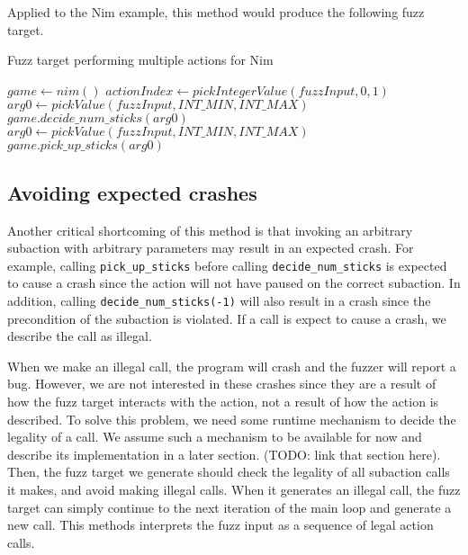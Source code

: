 Applied to the Nim example, this method would produce the following fuzz target.
\begin{algorithm}[H]
    \caption{Fuzz target performing multiple actions for Nim}
    \begin{algorithmic}[1]
    \STATE $game \gets nim()$
        \STATE $actionIndex \gets pickIntegerValue(fuzzInput, 0, 1)$
            \STATE $arg0 \gets pickValue(fuzzInput, INT\_MIN, INT\_MAX)$
            \STATE $game.decide\_num\_sticks(arg0)$
        \ENDIF
            \STATE $arg0 \gets pickValue(fuzzInput, INT\_MIN, INT\_MAX)$
            \STATE $game.pick\_up\_sticks(arg0)$
        \ENDIF
    \ENDWHILE
    \end{algorithmic}
\end{algorithm}

\subsection{Avoiding expected crashes}\label{avoidingCrashes}
Another critical shortcoming of this method is that invoking an arbitrary subaction with arbitrary parameters may result in an expected crash.
For example, calling \texttt{pick\_up\_sticks} before calling \texttt{decide\_num\_sticks} is expected to cause a crash since the action will not have paused on the correct subaction.
In addition, calling \texttt{decide\_num\_sticks(-1)} will also result in a crash since the precondition of the subaction is violated.
If a call is expect to cause a crash, we describe the call as illegal.

When we make an illegal call, the program will crash and the fuzzer will report a bug.
However, we are not interested in these crashes since they are a result of how the fuzz target interacts with the action, not a result of how the action is described.
To solve this problem, we need some runtime mechanism to decide the legality of a call.
We assume such a mechanism to be available for now and describe its implementation in a later section. (TODO: link that section here).
Then, the fuzz target we generate should check the legality of all subaction calls it makes, and avoid making illegal calls.
When it generates an illegal call, the fuzz target can simply continue to the next iteration of the main loop and generate a new call.
This methods interprets the fuzz input as a sequence of legal action calls.

